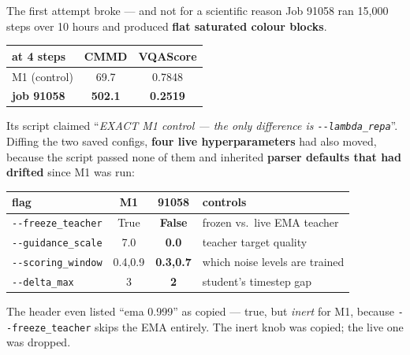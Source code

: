 \documentclass[10pt,aspectratio=169]{beamer}
\newcommand{\bad}[1]{\textcolor{bad}{\textbf{#1}}}
\begin{document}
\begin{frame}{The first attempt broke --- and not for a scientific reason}
  Job 91058 ran 15{,}000 steps over 10 hours and produced \bad{flat saturated colour blocks}.

  \begin{center}
  \begin{tabular}{lcc}
    \toprule
    at 4 steps & CMMD & VQAScore \\
    \midrule
    M1 (control) & 69.7 & 0.7848 \\
    \textbf{job 91058} & \bad{502.1} & \bad{0.2519} \\
    \bottomrule
  \end{tabular}
  \end{center}

  \vspace{0.6em}
  Its script claimed ``\emph{EXACT M1 control --- the only difference is
  \texttt{-{}-lambda\_repa}}''. Diffing the two saved configs, \bad{four live
  hyperparameters} had also moved, because the script passed none of them and inherited
  \textbf{parser defaults that had drifted} since M1 was run:

  \begin{center}
  \begin{tabular}{lccl}
    \toprule
    flag & M1 & 91058 & controls \\
    \midrule
    \texttt{-{}-freeze\_teacher}  & True    & \bad{False}   & frozen vs.\ live EMA teacher \\
    \texttt{-{}-guidance\_scale}  & 7.0     & \bad{0.0}     & teacher target quality \\
    \texttt{-{}-scoring\_window}  & 0.4,0.9 & \bad{0.3,0.7} & which noise levels are trained \\
    \texttt{-{}-delta\_max}       & 3       & \bad{2}       & student's timestep gap \\
    \bottomrule
  \end{tabular}
  \end{center}

  \vspace{0.4em}
  \small The header even listed ``ema 0.999'' as copied --- true, but \emph{inert} for M1,
  because \texttt{-{}-freeze\_teacher} skips the EMA entirely. The inert knob was copied;
  the live one was dropped.
\end{frame}
\end{document}
